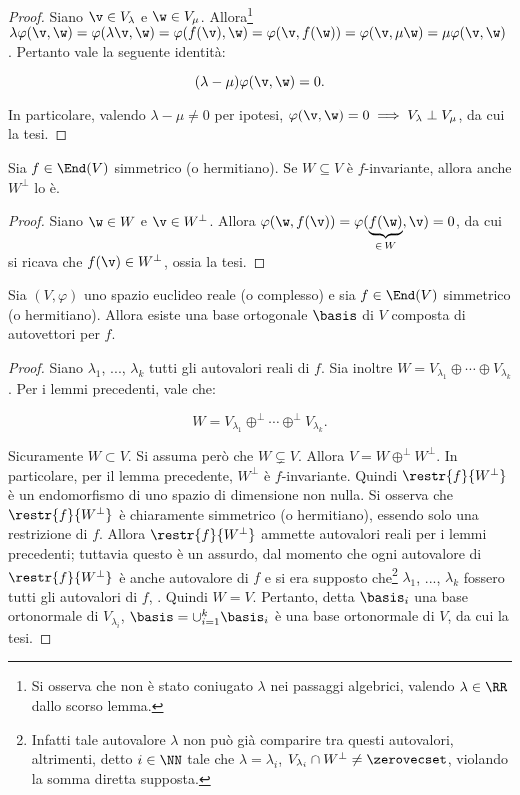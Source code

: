 \begin{proof}
	Siano $\v \in V_\lambda$ e $\w \in V_\mu$. Allora\footnote{Si osserva che non è stato coniugato $\lambda$
		nei passaggi algebrici, valendo $\lambda \in \RR$ dallo scorso lemma.} $\lambda \varphi(\v, \w) = \varphi(\lambda \v, \w) = \varphi(f(\v), \w) = \varphi(\v, f(\w)) = \varphi(\v, \mu \w) = \mu \varphi(\v, \w)$.
	Pertanto vale la seguente identità:
	
	\[ (\lambda - \mu) \varphi(\v, \w) = 0. \]
	
	\vskip 0.05in
	
	In particolare, valendo $\lambda - \mu \neq 0$ per ipotesi, $\varphi(\v, \w) = 0 \implies V_\lambda \perp V_\mu$,
	da cui la tesi.
\end{proof}

\begin{lemma}
	Sia $f \in \End(V)$ simmetrico (o hermitiano). Se $W \subseteq V$ è $f$-invariante, allora anche
	$W^\perp$ lo è.
\end{lemma}

\begin{proof}
	Siano $\w \in W$ e $\v \in W^\perp$. Allora $\varphi(\w, f(\v)) = \varphi(\underbrace{f(\w)}_{\in \, W}, \v) = 0$, da cui si ricava che $f(\v) \in W^\perp$, ossia la tesi.
\end{proof}

\begin{theorem} 
	Sia $(V, \varphi)$ uno spazio euclideo reale (o complesso) e sia $f \in \End(V)$ simmetrico (o hermitiano). Allora esiste una base ortogonale $\basis$ di $V$ composta di autovettori per $f$.
\end{theorem}

\begin{proof}
	Siano $\lambda_1$, ..., $\lambda_k$ tutti gli autovalori reali di $f$. Sia inoltre
	$W = V_{\lambda_1} \oplus \cdots \oplus V_{\lambda_k}$. Per i lemmi precedenti,
	vale che:
	
	\[ W = V_{\lambda_1} \oplus^\perp \cdots \oplus^\perp V_{\lambda_k}. \]
	
	\vskip 0.05in
	
	Sicuramente $W \subset V$. Si assuma però che $W \subsetneq V$. Allora $V = W \oplus^\perp W^\perp$. In particolare, per il lemma
	precedente, $W^\perp$ è $f$-invariante. Quindi $\restr{f}{W^\perp}$ è un endomorfismo
	di uno spazio di dimensione non nulla. Si osserva che $\restr{f}{W^\perp}$ è chiaramente
	simmetrico (o hermitiano), essendo solo una restrizione di $f$. Allora $\restr{f}{W^\perp}$ ammette
	autovalori reali per i lemmi precedenti; tuttavia questo è un assurdo, dal momento che ogni autovalore di $\restr{f}{W^\perp}$ è anche autovalore di $f$ e si era supposto che\footnote{Infatti tale autovalore $\lambda$
		non può già comparire tra questi autovalori, altrimenti, detto $i \in \NN$ tale che $\lambda = \lambda_i$,  $V_{\lambda_i} \cap W^\perp \neq \zerovecset$, violando la somma diretta supposta.} $\lambda_1$, ..., $\lambda_k$ fossero
	tutti gli autovalori di $f$, \Lightning. Quindi $W = V$. Pertanto, detta $\basis_i$ una base ortonormale
	di $V_{\lambda_i}$, $\basis = \cup_{i=1}^k \basis_i$ è una base ortonormale di $V$, da cui la tesi.
\end{proof}

